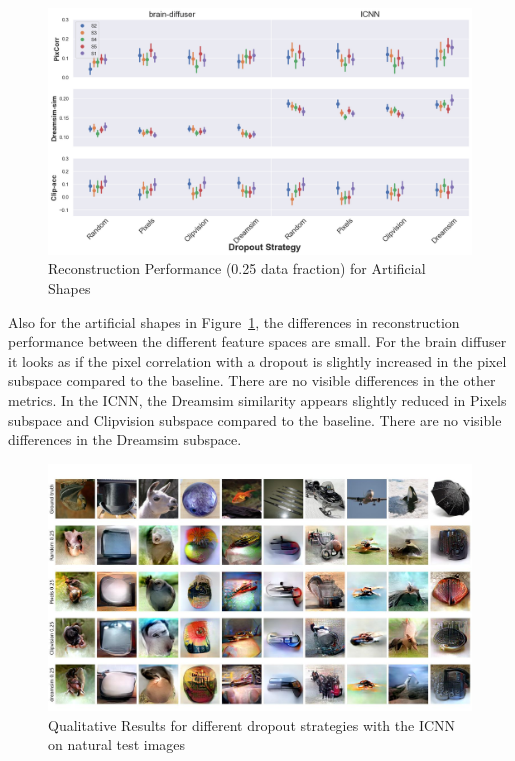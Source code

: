 \begin{figure}[ht]
  \centering
  \includegraphics[width=1\textwidth]{plots/dropout_eval_reconstruction_art.png}
  \caption{Reconstruction Performance (0.25 data fraction) for Artificial Shapes}\label{fig:dropout_eval_reconstruction_art}
\end{figure}


Also for the artificial shapes in Figure~\ref{fig:dropout_eval_reconstruction_art}, the differences in reconstruction performance between the different feature spaces are small. For the brain diffuser it looks as if the pixel correlation with a dropout is slightly increased in the pixel subspace compared to the baseline. There are no visible differences in the other metrics. In the ICNN, the Dreamsim similarity appears slightly reduced in Pixels subspace and Clipvision subspace compared to the baseline. There are no visible differences in the Dreamsim subspace. 

\begin{figure}[ht]
  \centering
  \includegraphics[width=1\textwidth]{plots/dropout_qual_eval_icnn_test.JPEG}
  \caption{Qualitative Results for different dropout strategies with the ICNN on natural test images}\label{fig:dropout_qual_eval_icnn_test}
\end{figure}

